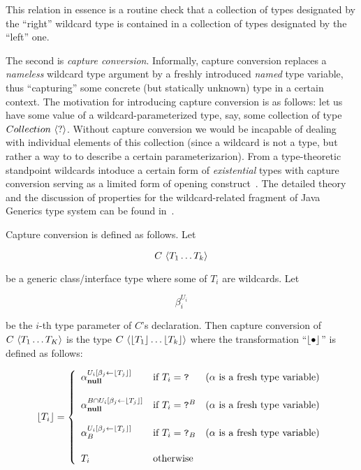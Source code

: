 This relation in essence is a routine check that a collection of types designated by the ``right'' wildcard type is
contained in a collection of types designated by the ``left'' one.

The second is \emph{capture conversion}. Informally, capture conversion replaces a \emph{nameless} wildcard type
argument by a freshly introduced \emph{named} type variable, thus ``capturing'' some concrete (but statically unknown)
type in a certain context. The motivation for introducing capture conversion is as follows: let us have
some value of a wildcard-parameterized type, say, some collection of type ${Collection}\,\left<{?}\right>$. Without capture
conversion we would be incapable of dealing with individual elements of this collection (since a wildcard is not a type,
but rather a way to to describe a certain parameterizarion). From a type-theoretic standpoint wildcards intoduce a
certain form of \emph{existential} types with capture conversion serving as a limited form of opening construct~\cite{tapl}.
The detailed theory and the discussion of properties for the wildcard-related fragment of Java Generics type system
can be found in~\cite{wild}.

Capture conversion is defined as follows. Let

\[
{C}\,\left<{T_1\dots T_k}\right>
\]

be a generic class/interface type where some of $T_i$ are wildcards. Let

\[
\beta_i^{U_i}
\]

be the $i$-th type parameter of $C$'s declaration. Then capture conversion of
${C}\,\left<{T_1\dots T_K}\right>$ is the type ${C}\,\left<{\lfloor{T_1}\rfloor\dots \lfloor{T_k}\rfloor}\right>$ where the transformation
``$\lfloor{\bullet}\rfloor$'' is defined as follows:

\[
\lfloor{T_i}\rfloor=\left\{
\begin{array}{lll}  
  \alpha^{U_i[\beta_j\gets \lfloor{T_j}\rfloor]}_{\mathbf{null}}      &\mbox{if }        T_i=\texttt{?}  &\mbox{($\alpha$ is a fresh type variable)}\\[5mm]
  \alpha^{B\cap U_i[\beta_j\gets \lfloor{T_j}\rfloor]}_{\mathbf{null}} &\mbox{if }        T_i=\texttt{?}^B &\mbox{($\alpha$ is a fresh type variable)}\\[5mm]
  \alpha^{U_i[\beta_j\gets \lfloor{T_j}\rfloor]}_B               &\mbox{if }        T_i=\texttt{?}_B &\mbox{($\alpha$ is a fresh type variable)}\\[5mm]
  T_i                                           &\mbox{otherwise}  & 
\end{array}\right.
\]

